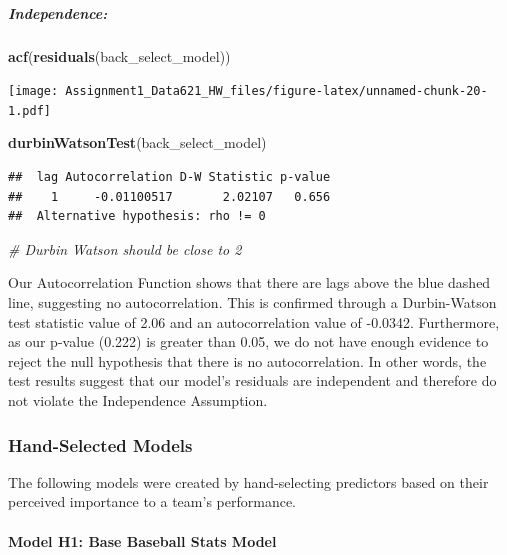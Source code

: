 \documentclass[
]{article}
\newenvironment{Shaded}{\begin{snugshade}}{\end{snugshade}}
\newcommand{\CommentTok}[1]{\textcolor[rgb]{0.56,0.35,0.01}{\textit{#1}}}
\newcommand{\FunctionTok}[1]{\textcolor[rgb]{0.13,0.29,0.53}{\textbf{#1}}}
\newcommand{\NormalTok}[1]{#1}
\begin{document}
\subparagraph{Independence:}\label{independence}

\begin{Shaded}
\begin{Highlighting}[]
\FunctionTok{acf}\NormalTok{(}\FunctionTok{residuals}\NormalTok{(back\_select\_model))}
\end{Highlighting}
\end{Shaded}

\texttt{[image: Assignment1\_Data621\_HW\_files/figure-latex/unnamed-chunk-20-1.pdf]}

\begin{Shaded}
\begin{Highlighting}[]
\FunctionTok{durbinWatsonTest}\NormalTok{(back\_select\_model)}
\end{Highlighting}
\end{Shaded}

\begin{verbatim}
##  lag Autocorrelation D-W Statistic p-value
##    1     -0.01100517       2.02107   0.656
##  Alternative hypothesis: rho != 0
\end{verbatim}

\begin{Shaded}
\begin{Highlighting}[]
\CommentTok{\# Durbin Watson should be close to 2}
\end{Highlighting}
\end{Shaded}

Our Autocorrelation Function shows that there are lags above the blue
dashed line, suggesting no autocorrelation. This is confirmed through a
Durbin-Watson test statistic value of 2.06 and an autocorrelation value
of -0.0342. Furthermore, as our p-value (0.222) is greater than 0.05, we
do not have enough evidence to reject the null hypothesis that there is
no autocorrelation. In other words, the test results suggest that our
model's residuals are independent and therefore do not violate the
Independence Assumption.

\subsubsection{Hand-Selected Models}\label{hand-selected-models}

The following models were created by hand-selecting predictors based on
their perceived importance to a team's performance.

\paragraph{Model H1: Base Baseball Stats
Model}\label{model-h1-base-baseball-stats-model}
\end{document}
